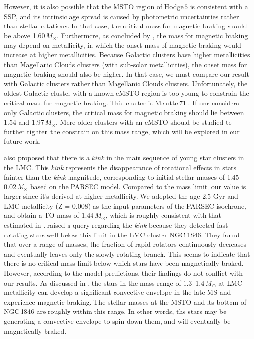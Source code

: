 \documentclass[twocolumn]{aastex631}
\begin{document}
However, it is also possible that the MSTO region of Hodge\,6 is consistent with a SSP, and its intrinsic age spread is caused by photometric uncertainties rather than stellar rotations. In that case, the critical mass for magnetic braking should be above 1.60\,$M_{\odot}$. Furthermore, as concluded by \citet{georgy2019disappearance}, the mass for magnetic braking may depend on metallicity, in which the onset mass of magnetic braking would increase at higher metallicities. Because Galactic clusters have higher metallicities than Magellanic Clouds clusters (with sub-solar metallicities), the onset mass for magnetic braking should also be higher. In that case, we must compare our result with Galactic clusters rather than Magellanic Clouds clusters. Unfortunately, the oldest Galactic cluster  \citep[1.22 Gyr;][Melotte\,71 ;]{cordoni2018extended} with a known eMSTO region is too young to constrain the critical mass for magnetic braking. This cluster is Melotte\,71 \citep[1.22 Gyr;][]{cordoni2018extended}. If one considers only Galactic clusters, the critical mass for magnetic braking should lie between 1.54 and 1.97\,$M_{\odot}$. More older clusters with an eMSTO should be studied to further tighten the constrain on this mass range, which will be explored in our future work.

\citet{2018ApJ...864L...3G} also proposed that there is a \textit{kink} in the main sequence of young star clusters in the LMC. This \textit{kink} represents the disappearance of rotational effects in stars fainter than the \textit{kink} magnitude, corresponding to initial stellar masses of 1.45 $\pm$0.02\,$M_{\odot}$ based on the PARSEC model. Compared to the mass limit, our value is larger since it's derived at higher metallicity. We adopted the age 2.5 Gyr and LMC metallicity (Z = 0.008) as the input parameters of the PARSEC isochrone, and obtain a TO mass of 1.44\,$M_{\odot}$, which is roughly consistent with that estimated in \citet{2018ApJ...864L...3G}. \citet{2020MNRAS.492.2177K} raised a query regarding the \textit{kink} because they detected fast-rotating stars well below this limit in the LMC cluster NGC 1846. They found that over a range of masses, the fraction of rapid rotators continuously decreases and eventually leaves only the slowly rotating branch. This seems to indicate that there is no critical mass limit below which stars have been magnetically braked. However, according to the model predictions, their findings do not conflict with our results. As discussed in \citet{georgy2019disappearance}, the stars in the mass range of 1.3--1.4\,$M_{\odot}$ at LMC metallicity can develop a significant convective envelope in the late MS and experience magnetic braking. The stellar masses at the MSTO and its bottom of NGC\,1846 are roughly within this range. In other words, the stars may be generating a convective envelope to spin down them, and will eventually be magnetically braked.
\end{document}
